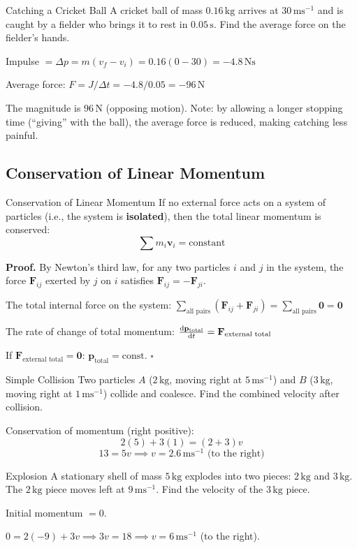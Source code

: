 \documentclass[12pt, a4paper]{book}
\newcommand{\vect}[1]{\mathbf{#1}}
\newcommand{\Fvec}{\mathbf{F}}
\newcommand{\vvec}{\mathbf{v}}
\newcommand{\ms}{\,\mathrm{ms}^{-1}}
\newcommand{\kg}{\,\mathrm{kg}}
\newcommand{\N}{\,\mathrm{N}}
\begin{document}
\begin{exmp}{Catching a Cricket Ball}{}
A cricket ball of mass $0.16\kg$ arrives at $30\ms$ and is caught by a fielder who brings it to rest in $0.05\,\mathrm{s}$. Find the average force on the fielder's hands.

\medskip
Impulse $= \Delta p = m(v_f - v_i) = 0.16(0 - 30) = -4.8\,\mathrm{Ns}$

Average force: $F = J/\Delta t = -4.8/0.05 = -96\N$

The magnitude is $96\N$ (opposing motion). Note: by allowing a longer stopping time (``giving'' with the ball), the average force is reduced, making catching less painful.
\end{exmp}

\subsection{Conservation of Linear Momentum}

\begin{thm}{Conservation of Linear Momentum}{}
If no external force acts on a system of particles (i.e., the system is \textbf{isolated}), then the total linear momentum is conserved:
\[
  \sum m_i \vvec_i = \text{constant}
\]
\end{thm}

\textbf{Proof.} By Newton's third law, for any two particles $i$ and $j$ in the system, the force $\Fvec_{ij}$ exerted by $j$ on $i$ satisfies $\Fvec_{ij} = -\Fvec_{ji}$.

The total internal force on the system: $\sum_{\text{all pairs}} (\Fvec_{ij} + \Fvec_{ji}) = \sum_{\text{all pairs}} \mathbf{0} = \mathbf{0}$

The rate of change of total momentum: $\dv{\vect{p}_{\text{total}}}{t} = \Fvec_{\text{external total}}$

If $\Fvec_{\text{external total}} = \mathbf{0}$: $\vect{p}_{\text{total}} = \text{const}$. $\square$

\begin{exmp}{Simple Collision}{}
Two particles $A$ ($2\kg$, moving right at $5\ms$) and $B$ ($3\kg$, moving right at $1\ms$) collide and coalesce. Find the combined velocity after collision.

\medskip
Conservation of momentum (right positive):
\[
  2(5) + 3(1) = (2+3)v
\]
\[
  13 = 5v \implies v = 2.6\ms \text{ (to the right)}
\]
\end{exmp}

\begin{exmp}{Explosion}{}
A stationary shell of mass $5\kg$ explodes into two pieces: $2\kg$ and $3\kg$. The $2\kg$ piece moves left at $9\ms$. Find the velocity of the $3\kg$ piece.

\medskip
Initial momentum $= 0$.

$0 = 2(-9) + 3v \implies 3v = 18 \implies v = 6\ms$ (to the right).
\end{exmp}
\end{document}
